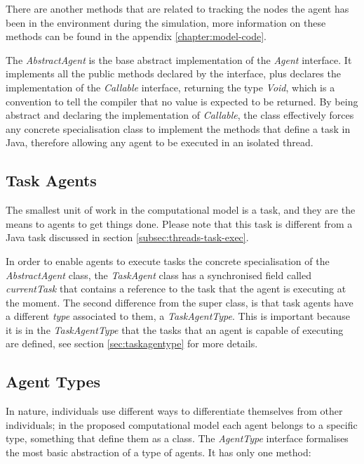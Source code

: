 There are another methods that are related to tracking the nodes the agent has been in the environment during the simulation, more information on these methods can be found in the appendix \ref{chapter:model-code}.

The \emph{AbstractAgent} is the base abstract implementation of the \emph{Agent} interface. It implements all the public methods declared by the interface, plus declares the implementation of the \emph{Callable} interface, returning the type \emph{Void}, which is a convention to tell the compiler that no value is expected to be returned. By being abstract and declaring the implementation of \emph{Callable}, the class effectively forces any concrete specialisation class to implement the methods that define a task in Java, therefore allowing any agent to be executed in an isolated thread.

\subsection{Task Agents}

The smallest unit of work in the computational model is a task, and they are the means to agents to get things done. Please note that this task is different from a Java task discussed in section \ref{subsec:threads-task-exec}. 

In order to enable agents to execute tasks the concrete specialisation of the \emph{AbstractAgent} class, the \emph{TaskAgent} class has a synchronised field called \emph{currentTask} that contains a reference to the task that the agent is executing at the moment. The second difference from the super class, is that task agents have a different \emph{type} associated to them, a \emph{TaskAgentType}. This is important because it is in the \emph{TaskAgentType} that the tasks that an agent is capable of executing are defined, see section \ref{sec:taskagentype} for more details.

\subsection{Agent Types}
\label{sec:agent-types}

In nature, individuals use different ways to differentiate themselves from other individuals; in the proposed computational model each agent belongs to a specific type, something that define them as a class. The \emph{AgentType} interface formalises the most basic abstraction of a type of agents.  It has only one method:

